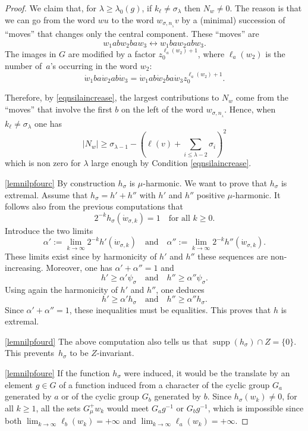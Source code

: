 \documentclass[11pt]{article}
\numberwithin{equation}{section}
\DeclareMathOperator{\supp}{supp}
\theoremstyle{definition}
\let\al\alpha
\let\la\lambda
\let\si\sigma
\let\ra\to
\begin{document}
\begin{proof}
We claim that, for $\la\geq \la_0(g)$, if $k_\ell\neq \si_\la$ then $N_w\neq 0$.
The reason is that we can go from the word $wu$ to the word
$w_{\si,n_{_\la}}v$ by a (minimal) succession of ``moves'' that changes only the
central component.
These ``moves'' are
\[
w_1abw_2baw_3 \longleftrightarrow w_1baw_2abw_3.
\]
The images in $G$ are modified by a factor $z_0^{\ell_a(w_2)+1}$, where $\ell_a(w_2)$
is the number of~$a$'s occurring in the word $w_2$:
\[
\dot{w}_1ba\dot{w}_2ab\dot{w}_3 = \dot{w}_1ab\dot{w}_2ba\dot{w}_3z_0^{\ell_a(w_2)+1}.
\]

Therefore, by \eqref{eqnsilaincrease}, the largest contributions to $N_w$ come from the ``moves''
that involve the first $b$
on the left of the word $w_{\si,n_{_\la}}$. Hence,
when $k_\ell\neq \si_\la$ one has
\[
|N_{w}|\geq
\si_{\la-1}- (\ell(v)+
\sum_{i\leq \la-2}\si_i)^2
\]
which is non zero for $\la$ large enough by Condition \eqref{eqnsilaincrease}.

\eqref{lemnilpfourc} By construction $h_\si$ is $\mu$-harmonic.
We want to prove that $h_\si$ is extremal.
Assume that $h_\si=h'+h''$ with $h'$ and $h''$ positive $\mu$-harmonic.
It follows also from the previous computations
that
\[
2^{-k}h_\si(\dot{w}_{\si,k})=1
\quad\text{for all $k\geq 0$.}
\]
Introduce the two limits
\[
\al':=\lim_{k\ra\infty}2^{-k}h'(\dot{w}_{\si,k})
\quad\text{and}\quad
\al'':=\lim_{k\ra\infty}2^{-k}h''(\dot{w}_{\si,k}).
\]
These limits exist since by harmonicity of $h'$ and $h''$ these sequences are non-increasing.
Moreover, one has $\al'+\al''=1$ and
\[
h'\geq \al' \psi_\si
\quad\text{and}\quad
h''\geq \al'' \psi_\si.
\]
Using again the harmonicity of $h'$ and $h''$, one deduces
\[
h'\geq \al' h_\si
\quad\text{and}\quad
h''\geq \al'' h_\si.
\]
Since $\al'+\al''=1$, these inequalities must be equalities. This proves that $h$ is extremal.

\eqref{lemnilpfourd} The above computation also tells us that
$\supp(h_\si)\cap Z=\{0\}$.
This prevents~$h_\si$ to be $Z$-invariant.

\eqref{lemnilpfoure} If the function $h_\si$ were induced, it would be the translate by an element $g\in G$
of a function induced
from a character of the cyclic group $G_a$ generated by $a$ or
of the cyclic group $G_b$ generated by $b$.
Since $h_\si(w_k)\neq 0$, for all $k\geq 1$,
all the sets $G_\mu^+ w_k$ would meet $G_a g^{-1}$ or $G_b g^{-1}$, which is impossible since
both $\lim_{k\ra\infty}\ell_b(w_k)=+\infty$ and $\lim_{k\ra\infty}\ell_a(w_k)=+\infty$.
\end{proof}
\end{document}
